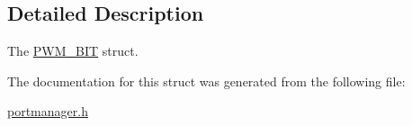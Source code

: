 \subsection{Detailed Description}
The \mbox{\hyperlink{structPWM__16BIT}{P\+W\+M\+\_\+B\+IT}} struct. 

The documentation for this struct was generated from the following file\+:\begin{DoxyCompactItemize}
\item 
\mbox{\hyperlink{portmanager_8h}{portmanager.\+h}}\end{DoxyCompactItemize}
